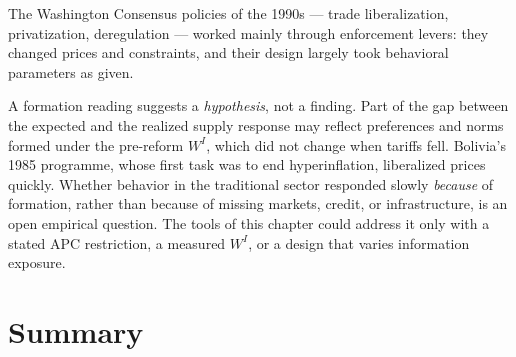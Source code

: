\documentclass[../structural_economics_book.tex]{subfiles}
\begin{document}
\begin{prebisch}
The Washington Consensus policies of the 1990s --- trade liberalization, privatization, deregulation --- worked mainly through enforcement levers: they changed prices and constraints, and their design largely took behavioral parameters as given.

A formation reading suggests a \textit{hypothesis}, not a finding. Part of the gap between the expected and the realized supply response may reflect preferences and norms formed under the pre-reform $W^I$, which did not change when tariffs fell. Bolivia's 1985 programme, whose first task was to end hyperinflation, liberalized prices quickly. Whether behavior in the traditional sector responded slowly \textit{because} of formation, rather than because of missing markets, credit, or infrastructure, is an open empirical question. The tools of this chapter could address it only with a stated APC restriction, a measured $W^I$, or a design that varies information exposure.
\end{prebisch}


\section{Summary}
\label{ch11:sec:summary}
\end{document}

